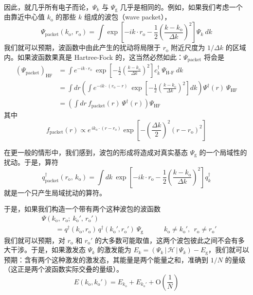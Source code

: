 因此，就几乎所有电子而论，$\Psi_{k}$ 与 $\Psi_{\mathrm{g}}$ 几乎是相同的。例如，如果我们考虑一个由靠近中心值 $k_{\mathrm{o}}$ 的那些 $k$ 组成的波包（wave packet），
\begin{equation*}
\Psi_{\text{packet}}(k_{\mathrm{o}},\,r_{\mathrm{o}})=\int\exp\left[-ik\cdot r_{\mathrm{o}}-\frac{1}{2}\left(\frac{k-k_{\mathrm{o}}}{\Delta k}\right)^{2}\right]\Psi_{k}\ dk
\end{equation*}
我们就可以预期，波函数中由此产生的扰动将局限于 $r_{\mathrm{o}}$ 附近尺度为 $1/\Delta k$ 的区域内。如果波函数果真是 Hartree-Fock 的，这当然必然如此：$\Psi_{\text{packet}}$ 将会是
\begin{align*}
\left(\Psi_{\text{packet}}\right)_{\mathrm{HF}}&=\int e^{-ik\cdot r_{\mathrm{o}}}\ \exp\left[-\frac{1}{2}\left(\frac{k-k_{\mathrm{o}}}{\Delta k}\right)^{2}\right]c^{\dagger}_{k}\ \Psi_{\text{H-F}}\ dk\\
&=\int dr\left(\int e^{-ik\cdot(r_{\mathrm{o}}-r)}\ \exp\left[-\frac{1}{2}\left(\frac{k-k_{\mathrm{o}}}{\Delta k}\right)^{2}\right]dk\right)\Psi^{\dagger}(r)\ \Psi_{\mathrm{HF}}\\
&=\left(\int dr\ f_{\text{packet}}(r)\ \Psi^{\dagger}(r)\right)\Psi_{\mathrm{HF}}
\end{align*}
其中
\begin{equation*}
f_{\text{packet}}(r)\propto e^{\,ik_{\mathrm{o}}\cdot(r-r_{\mathrm{o}})}\exp\left[-\left(\frac{\Delta k}{2}\right)^{2}(r-r_{\mathrm{o}})^{2}\right]
\end{equation*}

在更一般的情形中，我们感到，波包的形成将造成对真实基态 $\Psi_{\mathrm{g}}$ 的一个局域性的扰动。于是，算符
\begin{equation*}
q^{\dagger}_{\text{packet}}(r_{\mathrm{o}},\,k_{\mathrm{o}})=\int dk\ \exp\left[-ik\cdot r_{\mathrm{o}}-\frac{1}{2}\left(\frac{k-k_{\mathrm{o}}}{\Delta k}\right)^{2}\right]q^{\dagger}_{k}
\end{equation*}
就是一个只产生局域扰动的算符。

于是，如果我们构造一个带有两个这种波包的波函数
\begin{align*}
&\Psi(k_{\mathrm{o}},\,r_{\mathrm{o}};\ k_{\mathrm{o}}',\,r_{\mathrm{o}}')\\
&\qquad=q^{\dagger}(k_{\mathrm{o}},r_{\mathrm{o}})\,q^{\dagger}(k_{\mathrm{o}}',r_{\mathrm{o}}')\ \Psi_{\mathrm{g}}\qquad\quad k_{\mathrm{o}}\neq k_{\mathrm{o}}',\ \ r_{\mathrm{o}}\neq r_{\mathrm{o}}'
\end{align*}
我们就可以预期，对 $r_{\mathrm{o}}$ 和 $r_{\mathrm{o}}'$ 的大多数可能取值，这两个波包彼此之间不会有多大干涉。于是，如果激发态 $\Psi_{k}$ 的激发能为 $E_{k}=(\Psi_{k}\,|\,\mathcal{H}\,|\,\Psi_{k})-E_{\mathrm{g}}$，我们就可以预期：含有两个这种激发的激发态，其能量是两个能量之和，准确到 $1/N$ 的量级（这正是两个波函数实际交叠的量级）。
\begin{equation*}
E(k_{\mathrm{o}},k_{\mathrm{o}}')=E_{k_{\mathrm{o}}}+E_{k_{\mathrm{o}}'}+\mathrm{O}\left(\frac{1}{N}\right)
\end{equation*}

